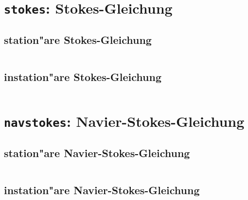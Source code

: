\documentclass[11pt,a4paper]{article}
\newenvironment{Code}{\begin{quote}\scriptsize}{\end{quote}}
\begin{document}
\begin{Code}
\begin{verbatim}
\end{verbatim}
\end{Code}

\section{{\tt stokes}: Stokes-Gleichung}

\subsection{station"are Stokes-Gleichung}
\begin{Code}
\begin{verbatim}
\end{verbatim}
\end{Code}
\subsection{instation"are Stokes-Gleichung}
\begin{Code}
\begin{verbatim}
\end{verbatim}
\end{Code}
 
\section{{\tt navstokes}: Navier-Stokes-Gleichung}
 
\subsection{station"are Navier-Stokes-Gleichung}
\begin{Code}
\begin{verbatim}
\end{verbatim}
\end{Code}
\subsection{instation"are Navier-Stokes-Gleichung}
\begin{Code}
\begin{verbatim}
\end{verbatim}
\end{Code}
 
\end{document}
